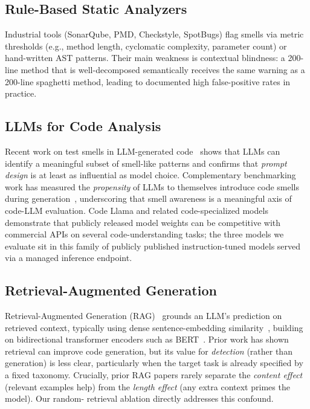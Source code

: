 \documentclass[conference]{IEEEtran}
\begin{document}
\subsection{Rule-Based Static Analyzers}
Industrial tools (SonarQube, PMD, Checkstyle, SpotBugs) flag smells via metric
thresholds (e.g., method length, cyclomatic complexity, parameter count) or
hand-written AST patterns. Their main weakness is contextual blindness: a 200-line
method that is well-decomposed semantically receives the same warning as a 200-line
spaghetti method, leading to documented high false-positive rates in
practice.

\subsection{LLMs for Code Analysis}
Recent work on test smells in LLM-generated
code~\cite{ouedraogo2024test, lucas2024evaluating} shows that LLMs can identify
a meaningful subset of smell-like patterns and confirms that
\emph{prompt design} is at least as influential as model choice. Complementary
benchmarking work has measured the \emph{propensity} of LLMs to themselves
introduce code smells during generation~\cite{velasco2024propense}, underscoring
that smell awareness is a meaningful axis of code-LLM evaluation. Code Llama and
related code-specialized models~\cite{roziere2023codellama} demonstrate that
publicly released model weights can be competitive with commercial APIs on
several code-understanding tasks; the three models we evaluate sit in this
family of publicly published instruction-tuned models served via a managed
inference endpoint.

\subsection{Retrieval-Augmented Generation}
Retrieval-Augmented Generation (RAG)~\cite{lewis2020retrieval} grounds an LLM's
prediction on retrieved context, typically using dense
sentence-embedding similarity~\cite{reimers2019sbert,karpukhin2020dpr}, building on
bidirectional transformer encoders such as BERT~\cite{devlin2019bert}. Prior work has shown
retrieval can improve code generation, but its
value for \emph{detection} (rather than generation) is less clear, particularly
when the target task is already specified by a fixed taxonomy. Crucially, prior
RAG papers rarely separate the \emph{content effect} (relevant examples help)
from the \emph{length effect} (any extra context primes the model). Our random-
retrieval ablation directly addresses this confound.
\end{document}
